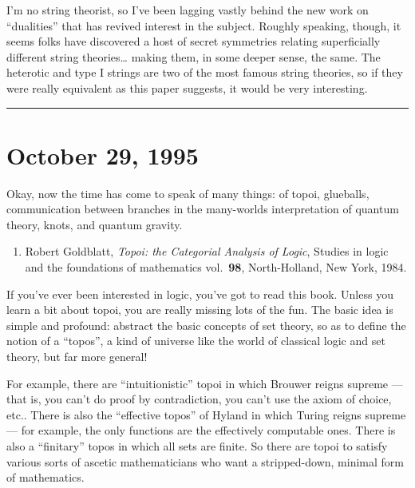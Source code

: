 \documentclass{article}
\def\tightlist{}
\begin{document}
I'm no string theorist, so I've been lagging vastly behind the new work
on ``dualities'' that has revived interest in the subject. Roughly
speaking, though, it seems folks have discovered a host of secret
symmetries relating superficially different string theories\ldots{}
making them, in some deeper sense, the same. The heterotic and type I
strings are two of the most famous string theories, so if they were
really equivalent as this paper suggests, it would be very interesting.

\begin{center}\rule{0.5\linewidth}{0.5pt}\end{center}



\hypertarget{week68}{%
\section{October 29, 1995}\label{week68}}

Okay, now the time has come to speak of many things: of topoi,
glueballs, communication between branches in the many-worlds
interpretation of quantum theory, knots, and quantum gravity.

\begin{enumerate}
\def\labelenumi{\arabic{enumi})}
\tightlist
\item
  Robert Goldblatt, \emph{Topoi: the Categorial Analysis of Logic},
  Studies in logic and the foundations of mathematics vol.~\textbf{98},
  North-Holland, New York, 1984.
\end{enumerate}

If you've ever been interested in logic, you've got to read this book.
Unless you learn a bit about topoi, you are really missing lots of the
fun. The basic idea is simple and profound: abstract the basic concepts
of set theory, so as to define the notion of a ``topos'', a kind of
universe like the world of classical logic and set theory, but far more
general!

For example, there are ``intuitionistic'' topoi in which Brouwer reigns
supreme --- that is, you can't do proof by contradiction, you can't use
the axiom of choice, etc.. There is also the ``effective topos'' of
Hyland in which Turing reigns supreme --- for example, the only
functions are the effectively computable ones. There is also a
``finitary'' topos in which all sets are finite. So there are topoi to
satisfy various sorts of ascetic mathematicians who want a
stripped-down, minimal form of mathematics.
\end{document}
